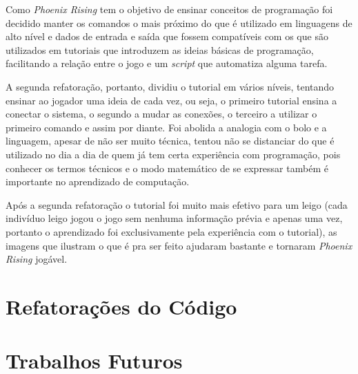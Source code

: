 Como \textit{Phoenix Rising} tem o objetivo de ensinar conceitos de programação 
foi decidido manter os comandos o mais próximo do que é utilizado em linguagens
de alto nível e dados de entrada e saída que fossem compatíveis com os que são 
utilizados em tutoriais que introduzem as ideias básicas de programação, 
facilitando a relação entre o jogo e um \textit{script} que automatiza alguma 
tarefa.

A segunda refatoração, portanto, dividiu o tutorial em vários níveis, tentando 
ensinar ao jogador uma ideia de cada vez, ou seja, o primeiro tutorial ensina 
a conectar o sistema, o segundo a mudar as conexões, o terceiro a utilizar o 
primeiro comando e assim por diante. Foi abolida a analogia com o bolo e a 
linguagem, apesar de não ser muito técnica, tentou não se distanciar do que é
utilizado no dia a dia de quem já tem certa experiência com programação, pois 
conhecer os termos técnicos e o modo matemático de se expressar também é 
importante no aprendizado de computação.

Após a segunda refatoração o tutorial foi muito mais efetivo para um leigo
(cada indivíduo leigo jogou o jogo sem nenhuma informação prévia e apenas uma 
vez, portanto o aprendizado foi exclusivamente pela experiência com o 
tutorial), as imagens que ilustram o que é pra ser feito ajudaram bastante
e tornaram \textit{Phoenix Rising} jogável.

\section{Refatorações do Código}

\section{Trabalhos Futuros}

